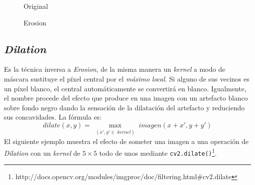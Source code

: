 \begin{figure}[H]
  \caption{Original}
  \centering \setlength\fboxsep{0pt} \setlength\fboxrule{0.5pt}
\end{figure}

\begin{figure}[H]
  \centering \setlength\fboxsep{0pt} \setlength\fboxrule{0.5pt}
  \caption{Erosion}
\end{figure}


\subsection{\emph{Dilation}}\label{tecnica:dilation}
Es la técnica inversa a \emph{Erosion}, de la misma manera un
\emph{kernel} a modo de máscara sustituye el píxel central por el
\emph{máximo local}. Si alguno de sus vecinos es un píxel blanco, el
central automáticamente se convertirá en blanco. Igualmente, el nombre
procede del efecto que produce en una imagen con un artefacto blanco
sobre fondo negro dando la sensación de la dilatación del artefacto y
reduciendo sus concavidades. La fórmula es:
\begin{equation*}
  dilate(x, y) = \max_{\substack{(x', y' \in \;kernel)}} imagen(x + x', y + y')
\end{equation*}
El siguiente ejemplo muestra el efecto de someter una imagen a una
operación de \emph{Dilation} con un \emph{kernel} de $5 \times 5$ todo
de unos mediante
\texttt{cv2.dilate()}\footnote{http://docs.opencv.org/modules/imgproc/doc/filtering.html\#cv2.dilate}.

